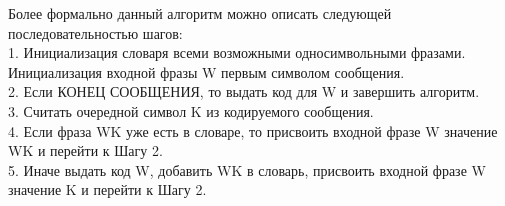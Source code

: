 \documentclass[a4paper, 12pt]{article}
\begin{document}
 Более формально данный алгоритм можно описать следующей последовательностью шагов:\\
    1. Инициализация словаря всеми возможными односимвольными фразами. Инициализация входной фразы W первым символом сообщения.\\
    2. Если КОНЕЦ СООБЩЕНИЯ, то выдать код для W и завершить алгоритм.\\
    3. Считать очередной символ K из кодируемого сообщения.\\
    4. Если фраза WK уже есть в словаре, то присвоить входной фразе W значение WK и перейти к Шагу 2.\\
    5. Иначе выдать код W, добавить WK в словарь, присвоить входной фразе W значение K и перейти к Шагу 2.\\
\end{document}
